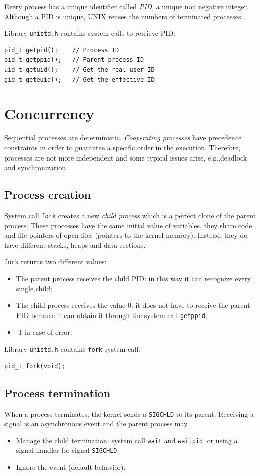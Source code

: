 Every process has a unique identifier called \emph{PID}, a unique non negative integer. Although a PID is unique, UNIX reuses the numbers of terminated processes.

Library \texttt{unistd.h} contains system calls to retrieve PID:
\begin{verbatim}
pid_t getpid();    // Process ID
pid_t getppid();   // Parent process ID
uid_t getuid();    // Get the real user ID
gid_t geteuid();   // Get the effective ID
\end{verbatim}
\section{Concurrency}
Sequential processes are deterministic. \textit{Cooperating processes} have precedence constraints in order to guarantee a specific order in the execution. Therefore, processes are not more independent and some typical issues arise, e.g.,\@ deadlock and synchronization.

\subsection{Process creation}
System call \texttt{fork} creates a new \emph{child process} which is a perfect clone of the parent process. These processes have the same initial value of variables, they share code and file pointers of open files (pointers to the kernel memory). Instead, they do have different stacks, heaps and data sections.

\texttt{fork} returns two different values:
\begin{itemize}
\item The parent process receives the child PID: in this way it can recognize every single child;
\item The child process receives the value 0: it does not have to receive the parent PID because it can obtain it through the system call \texttt{getppid};
\item -1 in case of error.
\end{itemize}

Library \texttt{unistd.h} contains \texttt{fork} system call:
\begin{verbatim}
pid_t fork(void);
\end{verbatim}

\subsection{Process termination}
When a process terminates, the kernel sends a \texttt{SIGCHLD} to its parent. Receiving a signal is an asynchronous event and the parent process may
\begin{itemize}
\item Manage the child termination: system call \texttt{wait} and \texttt{waitpid}, or using a signal handler for signal \texttt{SIGCHLD}.
\item Ignore the event (default behavior).
\end{itemize}

